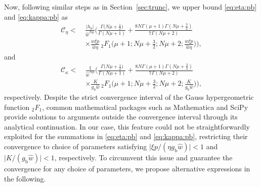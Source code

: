 \documentclass[journal,twocolumn]{IEEEtran}
\begin{document}
Now, following similar steps as in Section~\ref{sec:trunc}, we upper bound \eqref{eq:eta:pb} and \eqref{eq:kappa:pb} as
\begin{align}
    \mathcal{C}_{\eta} < \ & 
    \frac{ |h_0| }{\hat{w} ^{N \mu}}  \Bigg(\frac{\Gamma\big(N\mu +\frac{1}{2}\big)}{\Gamma(N\mu + 1)} +\frac{8 N \Gamma (\mu +1) \Gamma \left(N \mu +\frac{3}{2}\right)}{7 \Gamma (N \mu + 2)} \nonumber \\
    & \times \frac{w \xi  p}{\hat{w} \eta } \, _2F_1 \bigg(\mu +1;N \mu +\frac{3}{2};N \mu  +2;\frac{w \xi  p}{\hat{w} \eta }\bigg)\Bigg), \label{eq:eta:pb-converg}
\end{align}
and
\begin{align}
    \mathcal{C}_{\kappa} < \ & 
    \frac{1 }{\hat{w} ^{N \mu}}  \Bigg(\frac{\Gamma\big(N\mu +\frac{1}{2}\big)}{\Gamma(N\mu + 1)} +\frac{8 N \Gamma (\mu +1) \Gamma \left(N \mu +\frac{3}{2}\right)}{7 \Gamma (N \mu + 2)} \nonumber \\
    & \times \frac{K}{g_{\textrm{b}} \hat{w} } \, _2F_1 \bigg(\mu +1;N \mu +\frac{3}{2};N \mu  +2;\frac{K}{g_{\textrm{b}}\hat{w} }\bigg)\Bigg), \label{eq:kappa:pb-converg}
\end{align}
respectively.
Despite the strict convergence interval of the Gauss hypergeometric function $_2F_1$, common mathematical packages such as Mathematica and SciPy provide solutions to arguments outside the convergence interval through its analytical continuation. In our case, this feature could not be straightforwardly exploited for the summations in \eqref{eq:eta:pb} and \eqref{eq:kappa:pb}, restricting their convergence to choice of parameters satisfying $\big| \xi p /(\eta g_{\text{b}}\hat{w})\big| < 1$ and $\big|K/ (g_{\text{b}} \hat{w})\big| < 1$, respectively. To circumvent this issue and guarantee the convergence for any choice of parameters, we propose alternative expressions in the following.

\smallskip
\end{document}

